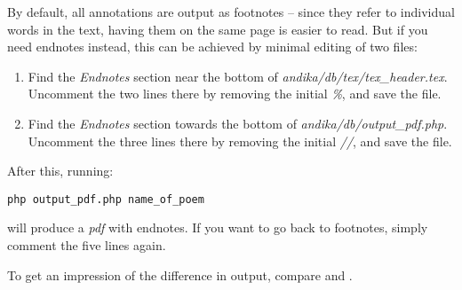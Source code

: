 By default, all annotations are output as footnotes -- since they refer to individual words in the text, having them on the same page is easier to read.  But if you need endnotes instead, this can be achieved by minimal editing of two files:
\begin{enumerate}
\item Find the \textit{Endnotes} section near the bottom of \textit{andika/db/tex/tex_header.tex}.  Uncomment the two lines there by removing the initial \textit{\%}, and save the file.
\item Find the \textit{Endnotes} section towards the bottom of \textit{andika/db/output_pdf.php}.  Uncomment the three lines there by removing the initial \textit{//}, and save the file.
\end{enumerate}

After this, running:

\verb|php output_pdf.php name_of_poem|

will produce a \textit{pdf} with endnotes.  If you want to go back to footnotes, simply comment the five lines again.

To get an impression of the difference in output, compare  and .


